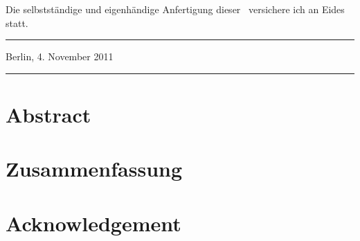 
Die selbstst\"{a}ndige und eigenh\"{a}ndige Anfertigung dieser \ARTDERARBEIT\
versichere ich an Eides statt.

\vspace{4cm}
\parbox{6cm}{\hrule \strut \centering \small Berlin, 4. November 2011}
\hfill
\parbox{6cm}{\hrule \strut \centering \small \AUTOR}

\newpage



\section*{Abstract}



\section*{Zusammenfassung}


\newpage



\section*{Acknowledgement}



